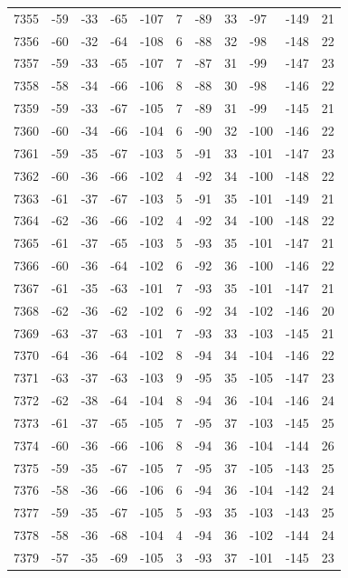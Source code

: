 \begin{table}[H]
\begin{tabular}{lllllllllll}
7355 & -59 & -33 & -65 & -107 & 7 & -89 & 33 & -97 & -149 & 21 \\
7356 & -60 & -32 & -64 & -108 & 6 & -88 & 32 & -98 & -148 & 22 \\
7357 & -59 & -33 & -65 & -107 & 7 & -87 & 31 & -99 & -147 & 23 \\
7358 & -58 & -34 & -66 & -106 & 8 & -88 & 30 & -98 & -146 & 22 \\
7359 & -59 & -33 & -67 & -105 & 7 & -89 & 31 & -99 & -145 & 21 \\
7360 & -60 & -34 & -66 & -104 & 6 & -90 & 32 & -100 & -146 & 22 \\
7361 & -59 & -35 & -67 & -103 & 5 & -91 & 33 & -101 & -147 & 23 \\
7362 & -60 & -36 & -66 & -102 & 4 & -92 & 34 & -100 & -148 & 22 \\
7363 & -61 & -37 & -67 & -103 & 5 & -91 & 35 & -101 & -149 & 21 \\
7364 & -62 & -36 & -66 & -102 & 4 & -92 & 34 & -100 & -148 & 22 \\
7365 & -61 & -37 & -65 & -103 & 5 & -93 & 35 & -101 & -147 & 21 \\
7366 & -60 & -36 & -64 & -102 & 6 & -92 & 36 & -100 & -146 & 22 \\
7367 & -61 & -35 & -63 & -101 & 7 & -93 & 35 & -101 & -147 & 21 \\
7368 & -62 & -36 & -62 & -102 & 6 & -92 & 34 & -102 & -146 & 20 \\
7369 & -63 & -37 & -63 & -101 & 7 & -93 & 33 & -103 & -145 & 21 \\
7370 & -64 & -36 & -64 & -102 & 8 & -94 & 34 & -104 & -146 & 22 \\
7371 & -63 & -37 & -63 & -103 & 9 & -95 & 35 & -105 & -147 & 23 \\
7372 & -62 & -38 & -64 & -104 & 8 & -94 & 36 & -104 & -146 & 24 \\
7373 & -61 & -37 & -65 & -105 & 7 & -95 & 37 & -103 & -145 & 25 \\
7374 & -60 & -36 & -66 & -106 & 8 & -94 & 36 & -104 & -144 & 26 \\
7375 & -59 & -35 & -67 & -105 & 7 & -95 & 37 & -105 & -143 & 25 \\
7376 & -58 & -36 & -66 & -106 & 6 & -94 & 36 & -104 & -142 & 24 \\
7377 & -59 & -35 & -67 & -105 & 5 & -93 & 35 & -103 & -143 & 25 \\
7378 & -58 & -36 & -68 & -104 & 4 & -94 & 36 & -102 & -144 & 24 \\
7379 & -57 & -35 & -69 & -105 & 3 & -93 & 37 & -101 & -145 & 23 \\

\end{tabular}
\end{table}
